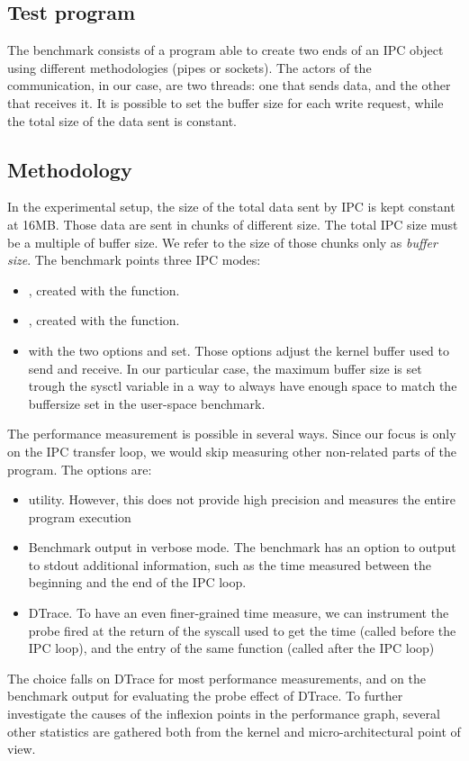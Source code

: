 \documentclass[a4paper,10pt]{article}
\begin{document}
\subsection{Test program}

The benchmark consists of a program able to create two ends of an IPC object using different methodologies (pipes or sockets). The actors of the communication, in our case, are two threads: one that sends data, and the other that receives it. It is possible to set the buffer size for each write request, while the total size of the data sent is constant.


\subsection{Methodology}


In the experimental setup, the size of the total data sent by IPC is kept constant at 16MB. Those data are sent in chunks of different size. The total IPC size must be a multiple of buffer size. We refer to the size of those chunks only as \textit{buffer size}.
The benchmark points three IPC modes: 
\begin{itemize}
    \item {}, created with the  function.
    \item {}, created with the  function.
    \item {} with the two options  and  set. Those options adjust the kernel buffer used to send and receive. In our particular case, the maximum buffer size is set trough the sysctl variable  in a way to always have enough space to match the buffersize set in the user-space benchmark.
\end{itemize}

The performance measurement is possible in several ways. Since our focus is only on the IPC transfer loop, we would skip measuring other non-related parts of the program. The options are:
\begin{itemize}
    \item {} utility. However, this does not provide high precision and measures the entire program execution
    \item Benchmark output in verbose mode. The benchmark has an option to output to stdout additional information, such as the time measured between the beginning and the end of the IPC loop.
    \item DTrace. To have an even finer-grained time measure, we can instrument the probe fired at the return of the syscall used to get the time (called before the IPC loop), and the entry of the same function (called after the IPC loop)
\end{itemize}
The choice falls on DTrace for most performance measurements, and on the benchmark output for evaluating the probe effect of DTrace. 
To further investigate the causes of the inflexion points in the performance graph, several other statistics are gathered both from the kernel and micro-architectural point of view.
\end{document}
